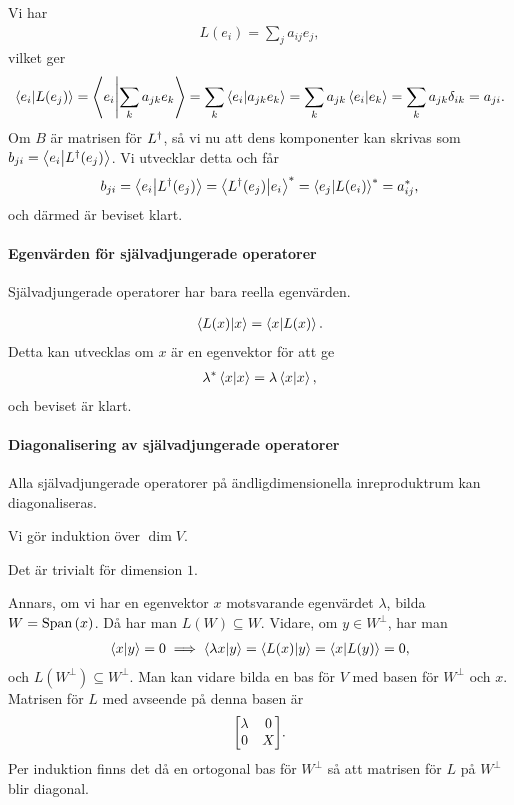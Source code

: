 \proof
Vi har
\begin{align*}
	L(e_{i}) = \sum\limits_{j}a_{ij}e_{j},
\end{align*}
vilket ger
\begin{align*}
	\bra{e_{i}}\ket{L(e_{j})} = \bra{e_{i}}\ket{\sum\limits_{k}a_{jk}e_{k}} = \sum\limits_{k}\bra{e_{i}}\ket{a_{jk}e_{k}} = \sum\limits_{k}a_{jk}\bra{e_{i}}\ket{e_{k}} = \sum\limits_{k}a_{jk}\delta_{ik} = a_{ji}.
\end{align*}
Om $B$ är matrisen för $L^{\dagger}$, så vi nu att dens komponenter kan skrivas som $b_{ji} = \bra{e_{i}}\ket{L^{\dagger}(e_{j})}$. Vi utvecklar detta och får
\begin{align*}
	b_{ji} = \bra{e_{i}}\ket{L^{\dagger}(e_{j})} = \bra{L^{\dagger}(e_{j})}\ket{e_{i}}^{*} = \bra{e_{j}}\ket{L(e_{i})}^{*} = a_{ij}^{*},
\end{align*}
och därmed är beviset klart.

\paragraph{Egenvärden för självadjungerade operatorer}
Självadjungerade operatorer har bara reella egenvärden.

\proof
\begin{align*}
	\bra{L(x)}\ket{x} = \bra{x}\ket{L(x)}.
\end{align*}
Detta kan utvecklas om $x$ är en egenvektor för att ge
\begin{align*}
	\lambda^{*}\bra{x}\ket{x} = \lambda\bra{x}\ket{x},
\end{align*}
och beviset är klart.

\paragraph{Diagonalisering av självadjungerade operatorer}
Alla självadjungerade operatorer på ändligdimensionella inreproduktrum kan diagonaliseras.

\proof
Vi gör induktion över $\dim{V}$.

Det är trivialt för dimension $1$.

Annars, om vi har en egenvektor $x$ motsvarande egenvärdet $\lambda$, bilda $W = \text{Span}\left(x\right)$. Då har man $L(W)\subseteq W$. Vidare, om $y\in W^{\perp}$, har man
\begin{align*}
	\bra{x}\ket{y} = 0\implies \bra{\lambda x}\ket{y} = \bra{L(x)}\ket{y} = \bra{x}\ket{L(y)} = 0,
\end{align*}
och $L(W^{\perp})\subseteq W^{\perp}$. Man kan vidare bilda en bas för $V$ med basen för $W^{\perp}$ och $x$. Matrisen för $L$ med avseende på denna basen är
\begin{align*}
	\mqty[
		\lambda & 0 \\
		0       & X
	].
\end{align*}
Per induktion finns det då en ortogonal bas för $W^{\perp}$ så att matrisen för $L$ på $W^{\perp}$ blir diagonal.

